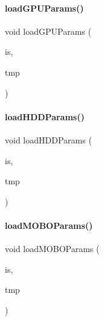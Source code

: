 \mbox{\label{_inventory_8h_aa795cbf45c10e4533a23961614749d05}} 
\paragraph{\texorpdfstring{loadGPUParams()}{loadGPUParams()}}
{\footnotesize\ttfamily void load\+G\+P\+U\+Params (\begin{DoxyParamCaption}\item[{std\+::istream \&}]{is,  }\item[{\mbox{\hyperlink{struct_temp_input}{Temp\+Input}} \&}]{tmp }\end{DoxyParamCaption})}

\mbox{\label{_inventory_8h_ab09373672ea8d4ea19f1903344fe327a}} 
\paragraph{\texorpdfstring{loadHDDParams()}{loadHDDParams()}}
{\footnotesize\ttfamily void load\+H\+D\+D\+Params (\begin{DoxyParamCaption}\item[{std\+::istream \&}]{is,  }\item[{\mbox{\hyperlink{struct_temp_input}{Temp\+Input}} \&}]{tmp }\end{DoxyParamCaption})}

\mbox{\label{_inventory_8h_ab92e8bf2c22b5df04897f18e888d7973}} 
\paragraph{\texorpdfstring{loadMOBOParams()}{loadMOBOParams()}}
{\footnotesize\ttfamily void load\+M\+O\+B\+O\+Params (\begin{DoxyParamCaption}\item[{std\+::istream \&}]{is,  }\item[{\mbox{\hyperlink{struct_temp_input}{Temp\+Input}} \&}]{tmp }\end{DoxyParamCaption})}

\mbox{\label{_inventory_8h_acecc59385cd8970fe6e368ea592362be}} 
